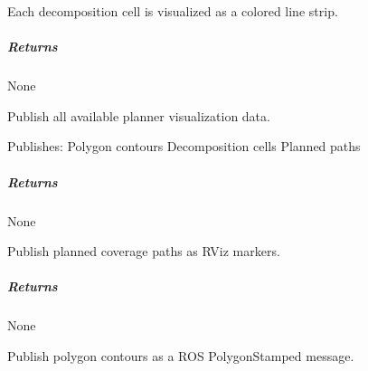 \documentclass[letterpaper,10pt,english]{sphinxmanual}
\begin{document}
\begin{fulllineitems}
\begin{fulllineitems}
\sphinxAtStartPar
Each decomposition cell is visualized as a colored line strip.


\subparagraph{Returns}
\label{\detokenize{mirte_lc_nav2.navigator_types:id5}}
\sphinxAtStartPar
None

\end{fulllineitems}


\begin{fulllineitems}
\label{\detokenize{mirte_lc_nav2.navigator_types:mirte_lc_nav2.navigator_types.SystematicNavigator.publish_info}}
\pysigstartsignatures
\pysiglinewithargsret
{}
{}
{}
\pysigstopsignatures
\sphinxAtStartPar
Publish all available planner visualization data.

\sphinxAtStartPar
Publishes:
\sphinxhyphen{} Polygon contours
\sphinxhyphen{} Decomposition cells
\sphinxhyphen{} Planned paths


\subparagraph{Returns}
\label{\detokenize{mirte_lc_nav2.navigator_types:id6}}
\sphinxAtStartPar
None

\end{fulllineitems}


\begin{fulllineitems}
\label{\detokenize{mirte_lc_nav2.navigator_types:mirte_lc_nav2.navigator_types.SystematicNavigator.publish_path}}
\pysigstartsignatures
\pysiglinewithargsret
{}
{}
{}
\pysigstopsignatures
\sphinxAtStartPar
Publish planned coverage paths as RViz markers.


\subparagraph{Returns}
\label{\detokenize{mirte_lc_nav2.navigator_types:id7}}
\sphinxAtStartPar
None

\end{fulllineitems}


\begin{fulllineitems}
\label{\detokenize{mirte_lc_nav2.navigator_types:mirte_lc_nav2.navigator_types.SystematicNavigator.publish_polygon}}
\pysigstartsignatures
\pysiglinewithargsret
{}
{}
{}
\pysigstopsignatures
\sphinxAtStartPar
Publish polygon contours as a ROS PolygonStamped message.



\end{fulllineitems}
\end{fulllineitems}
\end{document}
